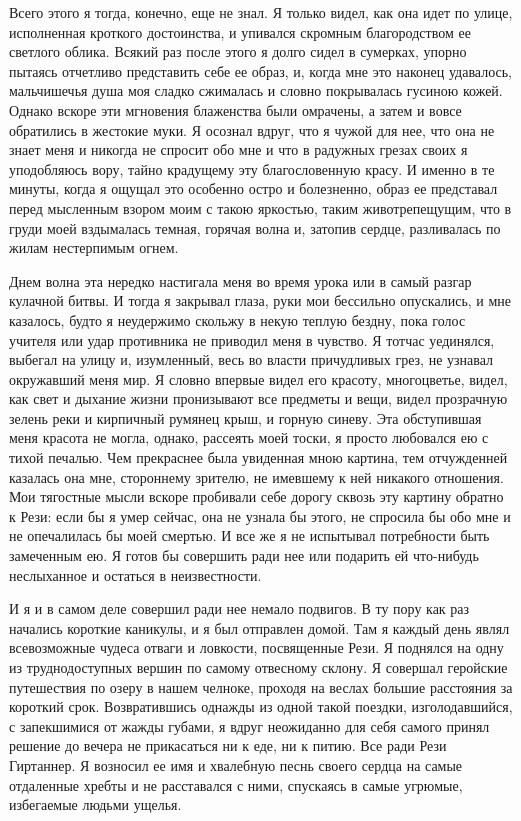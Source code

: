 Всего этого  я тогда, конечно,  еще не знал.  Я только видел,  как она
идет по  улице, исполненная кроткого достоинства,  и упивался скромным
благородством ее светлого облика. Всякий раз после этого я долго сидел
в сумерках,  упорно пытаясь  отчетливо представить  себе ее  образ, и,
когда мне это наконец удавалось, мальчишечья душа моя сладко сжималась
и  словно  покрывалась  гусиною  кожей. Однако  вскоре  эти  мгновения
блаженства были омрачены, а затем  и вовсе обратились в жестокие муки.
Я осознал вдруг, что я чужой для  нее, что она не знает меня и никогда
не спросит обо  мне и что в радужных грезах  своих я уподобляюсь вору,
тайно крадущему эту благословенную красу.  И именно в те минуты, когда
я ощущал  это особенно остро  и болезненно, образ ее  представал перед
мысленным взором  моим с такою  яркостью, таким животрепещущим,  что в
груди  моей  вздымалась  темная,  горячая  волна  и,  затопив  сердце,
разливалась по жилам нестерпимым огнем.

Днем  волна эта  нередко настигала  меня во  время урока  или в  самый
разгар кулачной  битвы. И тогда  я закрывал глаза, руки  мои бессильно
опускались, и мне казалось, будто  я неудержимо скольжу в некую теплую
бездну,  пока голос  учителя или  удар противника  не приводил  меня в
чувство. Я тотчас  уединялся, выбегал на улицу и,  изумленный, весь во
власти  причудливых грез,  не узнавал  окружавший меня  мир. Я  словно
впервые  видел его  красоту, многоцветье,  видел, как  свет и  дыхание
жизни пронизывают все предметы и  вещи, видел прозрачную зелень реки и
кирпичный румянец крыш, и горную  синеву. Эта обступившая меня красота
не могла, однако,  рассеять моей тоски, я просто любовался  ею с тихой
печалью. Чем  прекраснее была увиденная мною  картина, тем отчужденней
казалась  она мне,  стороннему  зрителю, не  имевшему  к ней  никакого
отношения. Мои тягостные мысли вскоре пробивали себе дорогу сквозь эту
картину обратно к Рези: если бы я умер сейчас, она не узнала бы этого,
не спросила бы обо мне и не опечалилась бы моей смертью. И все же я не
испытывал потребности  быть замеченным ею.  Я готов бы  совершить ради
нее или подарить ей что-нибудь неслыханное и остаться в неизвестности.

И я и  в самом деле совершил  ради нее немало подвигов. В  ту пору как
раз начались короткие каникулы, и я  был отправлен домой. Там я каждый
день являл всевозможные чудеса отваги  и ловкости, посвященные Рези. Я
поднялся на одну из труднодоступных вершин по самому отвесному склону.
Я совершал геройские путешествия по  озеру в нашем челноке, проходя на
веслах большие  расстояния за короткий срок.  Возвратившись однажды из
одной такой  поездки, изголодавшийся,  с запекшимися от  жажды губами,
я  вдруг  неожиданно для  себя  самого  принял  решение до  вечера  не
прикасаться ни к еде, ни к  питию. Все ради Рези Гиртаннер. Я возносил
ее имя и хвалебную песнь своего сердца на самые отдаленные хребты и не
расставался  с  ними, спускаясь  в  самые  угрюмые, избегаемые  людьми
ущелья.

